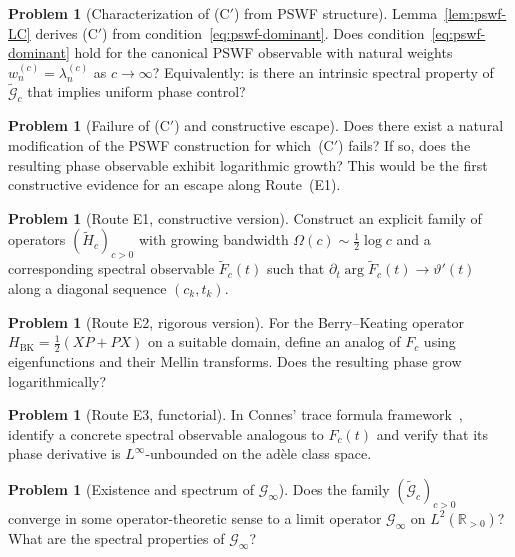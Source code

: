 \documentclass[12pt,a4paper]{amsart}
\theoremstyle{definition}
\newtheorem{problem}[theorem]{Problem}
\newcommand{\Glim}{\mathcal{G}_\infty}
\newcommand{\tGc}{\widetilde{\mathcal{G}}_c}
\begin{document}
\begin{problem}[Characterization of (C$'$) from
PSWF structure]
\label{prob:cprime}
Lemma~\ref{lem:pswf-LC} derives (C$'$) from
condition~\eqref{eq:pswf-dominant}. Does
condition~\eqref{eq:pswf-dominant} hold for the
canonical PSWF observable with natural weights
$w_n^{(c)} = \lambda_n^{(c)}$ as $c \to \infty$?
Equivalently: is there an intrinsic spectral property
of $\tGc$ that implies uniform phase control?
\end{problem}

\begin{problem}[Failure of (C$'$) and constructive
escape]
\label{prob:cprime-fail}
Does there exist a natural modification of the PSWF
construction for which~(C$'$) fails? If so, does the
resulting phase observable exhibit logarithmic growth?
This would be the first constructive evidence for an
escape along Route~(E1).
\end{problem}

\begin{problem}[Route E1, constructive version]
\label{prob:E1-constructive}
Construct an explicit family of operators
$(\widetilde{H}_c)_{c>0}$ with growing bandwidth
$\Omega(c) \sim \tfrac{1}{2}\log c$ and a
corresponding spectral observable
$\widetilde{F}_c(t)$ such that
$\partial_t \arg \widetilde{F}_c(t)
\to \vartheta'(t)$
along a diagonal sequence $(c_k, t_k)$.
\end{problem}

\begin{problem}[Route E2, rigorous version]
\label{prob:E2-rigorous}
For the Berry--Keating operator
$H_{\mathrm{BK}} = \tfrac{1}{2}(XP+PX)$ on a
suitable domain, define an analog of $F_c$ using
eigenfunctions and their Mellin transforms. Does
the resulting phase grow logarithmically?
\end{problem}

\begin{problem}[Route E3, functorial]
\label{prob:E3-functorial}
In Connes' trace formula
framework~\cite{Connes1999}, identify a concrete
spectral observable analogous to $F_c(t)$ and verify
that its phase derivative is $L^\infty$-unbounded
on the ad\`{e}le class space.
\end{problem}

\begin{problem}[Existence and spectrum of $\Glim$]
\label{prob:glim-existence}
Does the family $(\tGc)_{c>0}$ converge in some
operator-theoretic sense to a limit operator $\Glim$
on $L^2(\mathbb{R}_{>0})$? What are the spectral
properties of $\Glim$?
\end{problem}
\end{document}
